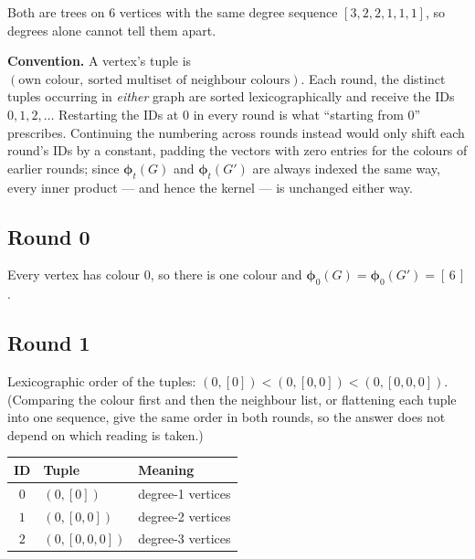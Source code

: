 \documentclass[11pt]{article}
\begin{document}
Both are trees on $6$ vertices with the same degree sequence $[3,2,2,1,1,1]$, so degrees
alone cannot tell them apart.

\noindent\textbf{\color{accent!85!black}Convention.} A vertex's tuple is
$(\text{own colour},\ \text{sorted multiset of neighbour colours})$. Each round, the
distinct tuples occurring in \emph{either} graph are sorted lexicographically and receive
the IDs $0,1,2,\dots$ Restarting the IDs at $0$ in every round is what ``starting from
$0$'' prescribes. Continuing the numbering across rounds instead would only shift each
round's IDs by a constant, padding the vectors with zero entries for the colours of earlier
rounds; since $\boldsymbol{\phi}_t(G)$ and $\boldsymbol{\phi}_t(G')$ are always indexed the
same way, every inner product --- and hence the kernel --- is unchanged either way.

\subsection*{Round 0}

Every vertex has colour $0$, so there is one colour and
$\boldsymbol{\phi}_0(G)=\boldsymbol{\phi}_0(G')=[\,6\,]$.

\subsection*{Round 1}

Lexicographic order of the tuples: $(0,[0])<(0,[0,0])<(0,[0,0,0])$. (Comparing the colour
first and then the neighbour list, or flattening each tuple into one sequence, give the
same order in both rounds, so the answer does not depend on which reading is taken.)

\begin{center}
\begin{tabular}{c l l}
\toprule
\rowcolor{white}
ID & Tuple & Meaning \\
\midrule
$0$ & $(0,[0])$ & degree-1 vertices \\
$1$ & $(0,[0,0])$ & degree-2 vertices \\
$2$ & $(0,[0,0,0])$ & degree-3 vertices \\
\bottomrule
\end{tabular}
\end{center}
\end{document}
